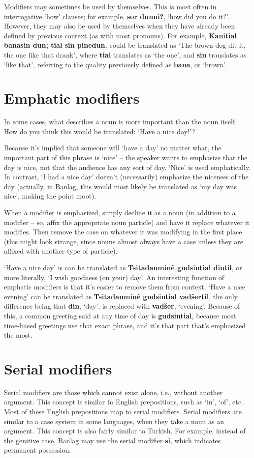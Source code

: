 \documentclass[12pt]{report}
\begin{document}
Modifiers may sometimes be used by themselves. This is most often in interrogative `how' clauses; for example, \textbf{sor dunni?}, `how did you do it?'. However, they may also be used by themselves when they have already been defined by previous context (as with most pronouns). For example, \textbf{Kanitial banasin dun; tial sin pinedun.} could be translated as `The brown dog dit it, the one like that drank', where \textbf{tial} translates as `the one', and \textbf{sin} translates as `like that', referring to the quality previously defined as \textbf{bana}, or `brown'.

\section{Emphatic modifiers}
In some cases, what describes a noun is more important than the noun itself. How do you think this would be translated: `Have a nice day!'?

Because it's implied that someone will `have a day' no matter what, the important part of this phrase is `nice' -- the speaker wants to emphasize that the day is nice, not that the audience has any sort of day. `Nice' is used emphatically. In contrast, `I had a nice day' doesn't (necessarily) emphasize the niceness of the day (actually, in Banlag, this would most likely be translated as `my day was nice', making the point moot).

When a modifier is emphasized, simply decline it as a noun (in addition to a modifier -- so, affix the appropriate noun particle) and have it replace whatever it modifies. Then remove the case on whatever it was modifying in the first place (this might look strange, since nouns almost always have a case unless they are affixed with another type of particle).

`Have a nice day' is can be translated as \textbf{Tsitadaumin\^e gudsintial dintil}, or more literally, `I wish goodness (on your) day'. An interesting function of emphatic modifiers is that it's easier to remove them from context. `Have a nice evening' can be translated as \textbf{Tsitadaumin\^e gudsintial vad\v sertil}, the only difference being that \textbf{din}, `day', is replaced with \textbf{vad\v ser}, `evening'. Because of this, a common greeting said at any time of day is \textbf{gudsintial}, because most time-based greetings use that exact phrase, and it's that part that's emphasized the most.

\section{Serial modifiers}
Serial modifiers are those which cannot exist alone, i.e., without another argument. This concept is similar to English prepositions, such as `in', `of', etc. Most of these English prepositions map to serial modifiers. Serial modifiers are similar to a case system in some languages, when they take a noun as an argument. This concept is also fairly similar to Turkish. For example, instead of the genitive case, Banlag may use the serial modifier \textbf{si}, which indicates permanent possession. 
\end{document}
